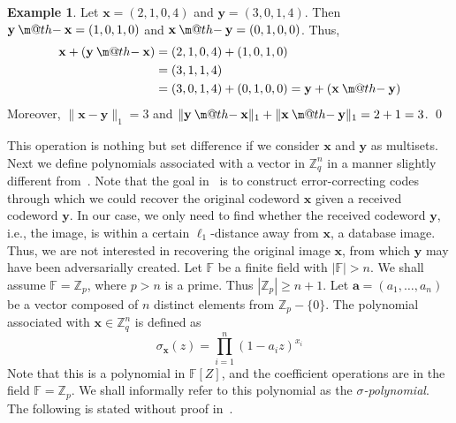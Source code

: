 \documentclass[pdflatex,sn-mathphys-num]{sn-jnl}
\makeatletter
\newcommand{\dotdiv}{\mathbin{\text{\@dotdiv}}}
\newcommand{\@dotdiv}{%
  \ooalign{\hidewidth\raise1ex\hbox{.}\hidewidth\cr$\m@th-$\cr}%
}
\theoremstyle{definition}
\newtheorem{example}{Example}
\newcommand{\vtr}[1]{\mathbf{#1}}
\newcommand{\norm}[1]{\lVert{#1}\rVert}
\makeatother
\begin{document}
\begin{example}
\label{ex:dotdiv}
Let $\vtr{x} = (2, 1, 0, 4)$ and $\vtr{y} = (3, 0, 1, 4)$. Then $\vtr{y} \dotdiv \vtr{x} = (1, 0, 1, 0)$ and $\vtr{x} \dotdiv \vtr{y} = (0, 1, 0, 0)$. Thus,
\begin{align*}
    \vtr{x} + (\vtr{y} \dotdiv \vtr{x}) &= (2, 1, 0, 4) + (1, 0, 1, 0) \\
    &= (3, 1, 1, 4)\\
    &= (3, 0, 1, 4) + (0, 1, 0, 0) = \vtr{y} + (\vtr{x} \dotdiv \vtr{y})
\end{align*}
Moreover, $\norm{\vtr{x} - \vtr{y}}_1 = 3$ and 
$\norm{\vtr{y} \dotdiv \vtr{x}}_1 + \norm{\vtr{x} \dotdiv \vtr{y}}_1 = 2 + 1 = 3$.
\qed
\end{example}
This operation is nothing but set difference if we consider $\vtr{x}$ and $\vtr{y}$ as multisets. Next we define polynomials associated with a vector in $\mathbb{Z}_q^n$ in a manner slightly different from~\cite{tallinil1codes}. Note that the goal in~\cite{tallinil1codes} is to construct error-correcting codes through which we could recover the original codeword $\vtr{x}$ given a received codeword $\vtr{y}$. In our case, we only need to find whether the received codeword $\vtr{y}$, i.e., the image, is within a certain $\ell_1$-distance away from $\vtr{x}$, a database image. Thus, we are not interested in recovering the original image $\vtr{x}$, from which $\vtr{y}$ may have been adversarially created. Let $\mathbb{F}$ be a finite field with $|\mathbb{F}| > n$. We shall assume $\mathbb{F} = \mathbb{Z}_p$, where $p > n$ is a prime. Thus $|\mathbb{Z}_p| \geq n + 1$. Let $\vtr{a} = (a_1, \ldots, a_n)$ be a vector composed of $n$ distinct elements from $\mathbb{Z}_p - \{0\}$. The polynomial associated with $\vtr{x} \in \mathbb{Z}_q^n$ is defined as
\begin{equation}
\label{eq:sigma-x}
\sigma_\vtr{x}(z) = \prod_{i=1}^n (1 - a_iz)^{x_i}
\end{equation}
Note that this is a polynomial in $\mathbb{F}[Z]$, and the coefficient operations are in the field $\mathbb{F} = \mathbb{Z}_p$. We shall informally refer to this polynomial as the \emph{$\sigma$-polynomial}. The following is stated without proof in~\cite{tallinil1codes}.
\end{document}
